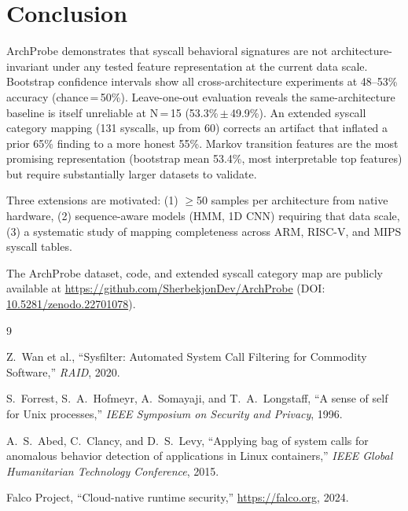 \documentclass[10pt,twocolumn]{article}
\begin{document}
\section{Conclusion}

ArchProbe demonstrates that syscall behavioral signatures are not
architecture-invariant under any tested feature representation at the current
data scale. Bootstrap confidence intervals show all cross-architecture
experiments at 48--53\% accuracy (chance\,=\,50\%). Leave-one-out evaluation
reveals the same-architecture baseline is itself unreliable at N\,=\,15
(53.3\%\,$\pm$\,49.9\%). An extended syscall category mapping (131 syscalls,
up from 60) corrects an artifact that inflated a prior 65\% finding to a more
honest 55\%. Markov transition features are the most promising representation
(bootstrap mean 53.4\%, most interpretable top features) but require
substantially larger datasets to validate.

Three extensions are motivated: (1) $\geq$50 samples per architecture from
native hardware, (2) sequence-aware models (HMM, 1D CNN) requiring that data
scale, (3) a systematic study of mapping completeness across ARM, RISC-V, and
MIPS syscall tables.

The ArchProbe dataset, code, and extended syscall category map are publicly
available at \url{https://github.com/SherbekjonDev/ArchProbe}
(DOI: \href{https://doi.org/10.5281/zenodo.22701078}{10.5281/zenodo.22701078}).


\begin{thebibliography}{9}

Z.~Wan et al.,
``Sysfilter: Automated System Call Filtering for Commodity Software,''
\emph{RAID}, 2020.

S.~Forrest, S.~A.~Hofmeyr, A.~Somayaji, and T.~A.~Longstaff,
``A sense of self for Unix processes,''
\emph{IEEE Symposium on Security and Privacy}, 1996.

A.~S.~Abed, C.~Clancy, and D.~S.~Levy,
``Applying bag of system calls for anomalous behavior detection of
applications in Linux containers,''
\emph{IEEE Global Humanitarian Technology Conference}, 2015.

Falco Project, ``Cloud-native runtime security,''
\url{https://falco.org}, 2024.

\end{thebibliography}
\end{document}
